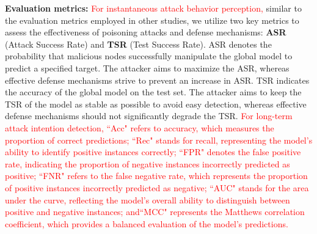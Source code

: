 \documentclass[lettersize,journal]{IEEEtran}
\begin{document}
\textbf{Evaluation metrics:}
\textcolor{red}{For instantaneous attack behavior perception,} similar to the evaluation metrics employed in other studies\cite{tang2023port, jin2024learning, rong2023special}, we utilize two key metrics to assess the effectiveness of poisoning attacks and defense mechanisms: \textbf{ASR} (Attack Success Rate) and \textbf{TSR} (Test Success Rate). ASR denotes the probability that malicious nodes successfully manipulate the global model to predict a specified target. The attacker aims to maximize the ASR, whereas effective defense mechanisms strive to prevent an increase in ASR. TSR indicates the accuracy of the global model on the test set. The attacker aims to keep the TSR of the model as stable as possible to avoid easy detection, whereas effective defense mechanisms should not significantly degrade the TSR. \textcolor{red}{For long-term attack intention detection, ``Acc" refers to accuracy, which measures the proportion of correct predictions; ``Rec" stands for recall, representing the model's ability to identify positive instances correctly; ``FPR" denotes the false positive rate, indicating the proportion of negative instances incorrectly predicted as positive; ``FNR" refers to the false negative rate, which represents the proportion of positive instances incorrectly predicted as negative; ``AUC" stands for the area under the curve, reflecting the model's overall ability to distinguish between positive and negative instances; and``MCC" represents the Matthews correlation coefficient, which provides a balanced evaluation of the model's predictions.}
\end{document}
